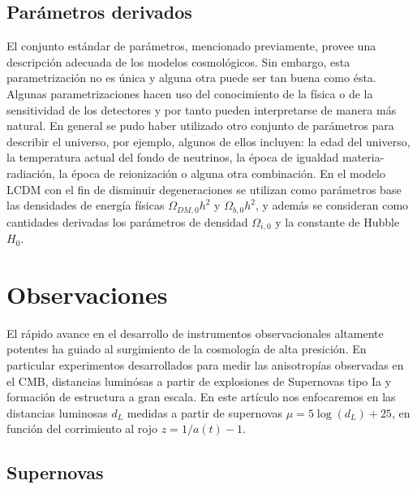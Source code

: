 \documentclass[10.5pt,prb,
               showpacs,            %
               preprintnumbers,     %
               aps,                 %
               prl,          	    %
               letterpaper,             %
               superscriptaddress,      %
               nofootinbib,         %
               tightenlines,        %
               floats,floatfix      %
               ,usenatbib]{revtex4-1}%
\begin{document}
\subsection*{Par\'ametros derivados}


El conjunto est\'andar de par\'ametros, mencionado previamente, provee una descripci\'on adecuada de los modelos
cosmol\'ogicos. Sin embargo, esta parametrizaci\'on no es \'unica y alguna otra 
puede ser tan buena como \'esta. Algunas parametrizaciones hacen uso del conocimiento de la f\'isica o de la 
sensitividad de los detectores y por tanto pueden interpretarse de manera m\'as natural. En general se pudo haber
utilizado otro conjunto de par\'ametros para describir el universo, por ejemplo, algunos de ellos incluyen: la edad del universo, 
la temperatura actual del fondo de neutrinos, la \'epoca de igualdad materia-radiaci\'on, la \'epoca de reionizaci\'on 
o alguna otra combinaci\'on. 
En el modelo LCDM con el fin de disminuir degeneraciones se utilizan como par\'ametros base las densidades de energ\'ia
f\'isicas $\Omega_{DM,0}h^2$ y $\Omega_{b,0}h^2$, y adem\'as se consideran como cantidades derivadas los
par\'ametros de densidad $\Omega_{i,0}$ y la constante de Hubble $H_0$.


\section{Observaciones}

El r\'apido avance en el desarrollo de instrumentos observacionales altamente potentes ha guiado
al surgimiento de la cosmolog\'ia de alta presici\'on.
En particular experimentos desarrollados para medir las anisotrop\'ias observadas en el CMB, 
distancias lumin\'osas a partir de explosiones de Supernovas tipo Ia y formaci\'on de estructura
a gran escala. En este art\'iculo nos enfocaremos en las distancias luminosas $d_L$ medidas a partir de supernovas
$\mu = 5\log(d_L) + 25$, en funci\'on del corrimiento al rojo $z = 1/a(t) -1$.
 

\subsection{Supernovas}
\end{document}

